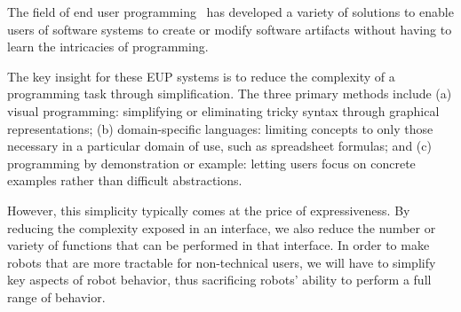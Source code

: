 \documentclass[10pt,twocolumn]{article}
\begin{document}
The field of end user programming~\cite{lieberman-yourwish,dontcheva-nocode} has developed a variety of solutions to enable users of software systems to create or modify software artifacts without having to learn the intricacies of programming.  

The key insight for these EUP systems is to reduce the complexity of a programming task through simplification. The three primary methods include (a) visual programming: simplifying or eliminating tricky syntax through graphical representations; (b) domain-specific languages: limiting concepts to only those necessary in a particular domain of use, such as spreadsheet formulas; and (c) programming by demonstration or example: letting users focus on concrete examples rather than difficult abstractions.

However, this simplicity typically comes at the price of expressiveness. By reducing the complexity exposed in an interface, we also reduce the number or variety of functions that can be performed in that interface. In order to make robots that are more tractable for non-technical users, we will have to simplify key aspects of robot behavior, thus sacrificing robots' ability to perform a full range of behavior.



\end{document}
